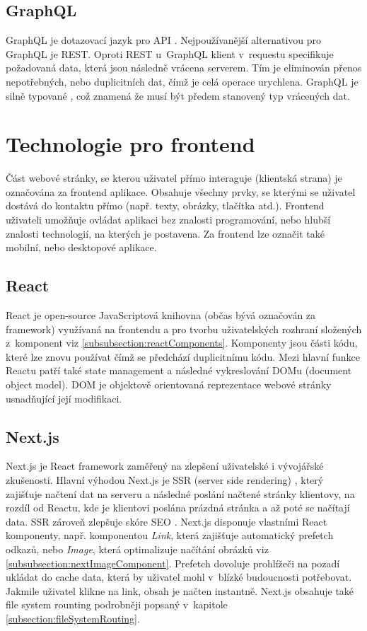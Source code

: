 \documentclass[12pt, a4paper,
  oneside,      %
]{report}
\begin{document}
    \subsection{GraphQL}
    GraphQL je dotazovací jazyk pro API \cite{graphqlIntroduction}. Nejpoužívanější alternativou pro GraphQL je REST. Oproti REST u~GraphQL klient v~requestu specifikuje požadovaná data, která jsou následně vrácena serverem. Tím je eliminován přenos nepotřebných, nebo duplicitních dat, čímž je celá operace urychlena. GraphQL je silně typované \cite{graphqlTypes}, což znamená že musí být předem stanovený typ vrácených dat. \cite{restApiRedHat}\cite{whatIsApiAws}


\section{Technologie pro frontend}
Část webové stránky, se kterou uživatel přímo interaguje (klientská strana) je označována za frontend aplikace. Obsahuje všechny prvky, se kterými se uživatel dostává do kontaktu přímo (např. texty, obrázky, tlačítka atd.). Frontend uživateli umožňuje ovládat aplikaci bez znalosti programování, nebo hlubší znalosti technologií, na kterých je postavena. Za frontend lze označit také mobilní, nebo desktopové aplikace. \cite{whatIsFrontend}

    \subsection{React}
    React je open-source JavaScriptová knihovna (občas bývá označován za framework) využívaná na frontendu a pro tvorbu uživatelských rozhraní složených z~komponent viz \ref{subsubsection:reactComponents}. Komponenty jsou části kódu, které lze znovu používat čímž se předchází duplicitnímu kódu. Mezi hlavní funkce Reactu patří také state management a následné vykreslování DOMu (document object model). DOM je objektově orientovaná reprezentace webové stránky usnadňující její modifikaci. \cite{reactComponentsAndProps}\cite{gettingStartedReact}
    \subsection{Next.js}
    Next.js je React framework zaměřený na zlepšení uživatelské i vývojářské zkušenosti. Hlavní výhodou Next.js je SSR (server side rendering) \cite{whatIsSSR}, který zajišťuje načtení dat na serveru a následné poslání načtené stránky klientovy, na rozdíl od Reactu, kde je klientovi poslána prázdná stránka a až poté se načítají data. SSR zároveň zlepšuje skóre SEO \cite{whatIsSEO}. Next.js disponuje vlastními React komponenty, např. komponentou \textit{Link}, která zajišťuje automatický prefetch odkazů, nebo \textit{Image}, která optimalizuje načítání obrázků viz \ref{subsubsection:nextImageComponent}. Prefetch dovoluje prohlížeči na pozadí ukládat do cache data, která by uživatel mohl v~blízké budoucnosti potřebovat. Jakmile uživatel klikne na link, obsah je načten instantně. Next.js obsahuje také file system rounting podrobněji popsaný v~kapitole \ref{subsection:fileSystemRouting}. \cite{nextGetStarted}
\end{document}
